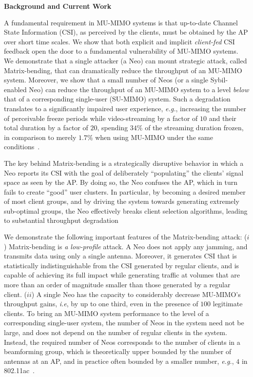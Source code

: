 {\bf Background and Current Work}

A fundamental requirement in MU-MIMO systems is that up-to-date Channel State Information (CSI), as perceived by the clients, must be obtained by the AP over short time scales. We show that both explicit and implicit \emph{client-fed} CSI feedback open the door to a fundamental vulnerability of MU-MIMO systems. We demonstrate that a single attacker (a Neo) can mount strategic attack, called Matrix-bending, that can dramatically reduce the throughput
of an MU-MIMO system. Moreover, we show that a small number of Neos (or a single Sybil-enabled Neo) can reduce the throughput of an MU-MIMO system to a level \emph{below} that of a corresponding single-user (SU-MIMO) system. Such a degradation translates to a significantly impaired user experience, \emph{e.g.}, increasing the number of perceivable freeze periods while video-streaming by a factor of $10$ and their total duration by a factor of $20$,
spending $34\%$ of the streaming duration frozen, in comparison to merely $1.7\%$ when using MU-MIMO under the same conditions~\cite{mu-mimoUXeffect,mimo13sigcomm}.

The key behind Matrix-bending is a strategically disruptive behavior in which a Neo reports its CSI with the goal of deliberately ``populating'' the clients' signal space as seen by the AP. By doing so, the Neo confuses the AP, which in turn fails to create ``good'' user clusters. In particular, by becoming a desired member of most client groups, and by driving the system towards generating extremely sub-optimal groups, the Neo effectively breaks client selection algorithms, leading to substantial throughput degradation


We demonstrate the following important features of the Matrix-bending attack:
($i$) Matrix-bending is \emph{a low-profile} attack. A Neo does not apply any jamming, and transmits data using only a single antenna. Moreover, it generates CSI that is statistically indistinguishable from the CSI generated by regular clients, and is capable of achieving its full impact while generating traffic at volumes that are more than an order of magnitude smaller than those generated by a regular client.
($ii$) A single Neo has the capacity to considerably decrease MU-MIMO's throughput gains, \emph{i.e}, by up to one third, even in the presence of $100$ legitimate clients. To bring an MU-MIMO system performance to the level of a corresponding single-user system, the number of Neos in the system need not be large, and does not depend on the number of regular clients in the system. Instead, the required number of Neos corresponds to the number of clients in a beamforming group, which is theoretically upper bounded by the number of antennas at an AP, and in practice often bounded by a smaller number, \emph{e.g.}, $4$ in 802.11ac~\cite{std11ac}.

